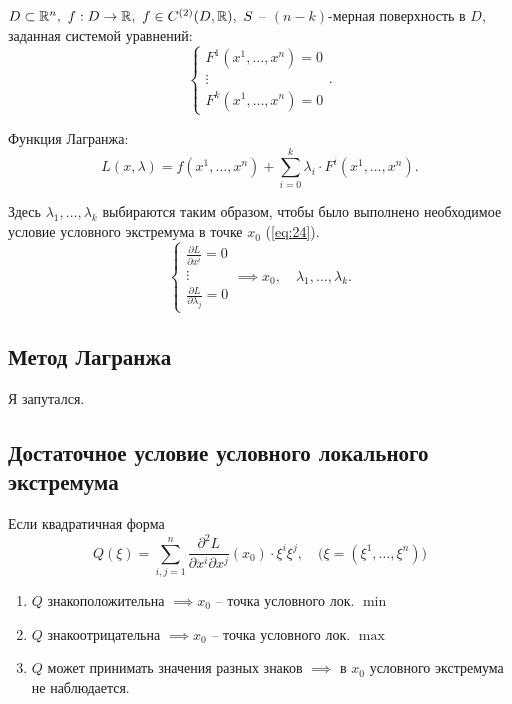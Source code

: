 \begin{note}
    $ D \subset \mathbb{R}^n, \ f:D\rightarrow\mathbb{R}, \ f \in C^{(2)} (D,\mathbb{R}), \ S$ -- $(n-k)$-мерная поверхность в $D$, заданная системой уравнений:
    \[
        \left\{\begin{array}{l}
            F^1(x^1,\ldots,x^n) = 0 \\
            \vdots                  \\
            F^k(x^1,\ldots,x^n) = 0
        \end{array}\right..
    \]

    Функция Лагранжа:
    \[
        L(x,\lambda) = f(x^1,\ldots,x^n) + \sum_{i = 0}^{k}\lambda_i \cdot F^i(x^1,\ldots,x^n).
    \]

    Здесь $\lambda_1,\ldots,\lambda_k$ выбираются таким образом, чтобы было выполнено необходимое условие условного экстремума в точке $x_0$ (\ref{eq:24}).
    \[
        \left\{\begin{array}{l}
            \frac{\partial L}{\partial x^i} = 0 \\
            \vdots                              \\
            \frac{\partial L}{\partial \lambda_j} = 0
        \end{array}\right. \implies x_0,\quad \lambda_1,\ldots,\lambda_k.
    \]
\end{note}

\subsection{Метод Лагранжа}

Я запутался.

\subsection{Достаточное условие условного локального экстремума}

\begin{theorem}
    Если квадратичная форма
    \[
        Q(\xi) = \sum_{i,j=1}^{n}\frac{\partial^2 L}{\partial x^i \partial x^j}(x_0)\cdot\xi^i\xi^j, \quad \big(\xi=(\xi^1,\ldots,\xi^n)\big)
    \]
    \begin{enumerate}
        \item $Q$ знакоположительна $\implies x_0$ -- точка условного лок. $\min$
        \item $Q$ знакоотрицательна $\implies x_0$ -- точка условного лок. $\max$
        \item $Q$ может принимать значения разных знаков $\implies$ в $x_0$ условного экстремума не наблюдается.
    \end{enumerate}
\end{theorem}

\newpage

